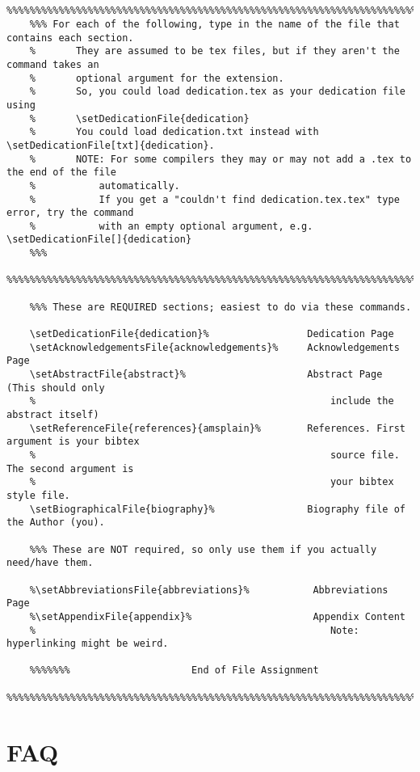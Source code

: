 \documentclass{article}
\begin{document}
\begin{verbatim}
    
    %%%%%%%%%%%%%%%%%%%%%%%%%%%%%%%%%%%%%%%%%%%%%%%%%%%%%%%%%%%%%%%%%%%%%%%%%%%%%%%%
    %%% For each of the following, type in the name of the file that contains each section. 
    %       They are assumed to be tex files, but if they aren't the command takes an 
    %       optional argument for the extension.
    %       So, you could load dedication.tex as your dedication file using 
    %       \setDedicationFile{dedication}
    %       You could load dedication.txt instead with \setDedicationFile[txt]{dedication}.
    %       NOTE: For some compilers they may or may not add a .tex to the end of the file 
    %           automatically.
    %           If you get a "couldn't find dedication.tex.tex" type error, try the command 
    %           with an empty optional argument, e.g. \setDedicationFile[]{dedication}
    %%%
    %%%%%%%%%%%%%%%%%%%%%%%%%%%%%%%%%%%%%%%%%%%%%%%%%%%%%%%%%%%%%%%%%%%%%%%%%%%%%%%%
    
    %%% These are REQUIRED sections; easiest to do via these commands.
    
    \setDedicationFile{dedication}%                 Dedication Page
    \setAcknowledgementsFile{acknowledgements}%     Acknowledgements Page
    \setAbstractFile{abstract}%                     Abstract Page (This should only 
    %                                                   include the abstract itself)
    \setReferenceFile{references}{amsplain}%        References. First argument is your bibtex 
    %                                                   source file. The second argument is 
    %                                                   your bibtex style file.
    \setBiographicalFile{biography}%                Biography file of the Author (you).
    
    %%% These are NOT required, so only use them if you actually need/have them.
    
    %\setAbbreviationsFile{abbreviations}%           Abbreviations Page
    %\setAppendixFile{appendix}%                     Appendix Content 
    %                                                   Note: hyperlinking might be weird.
    
    %%%%%%%                     End of File Assignment
    %%%%%%%%%%%%%%%%%%%%%%%%%%%%%%%%%%%%%%%%%%%%%%%%%%%%%%%%%%%%%%%%%%%%%%%%%%%%%%%%
    \end{verbatim}
    

\section{FAQ}
\end{document}
